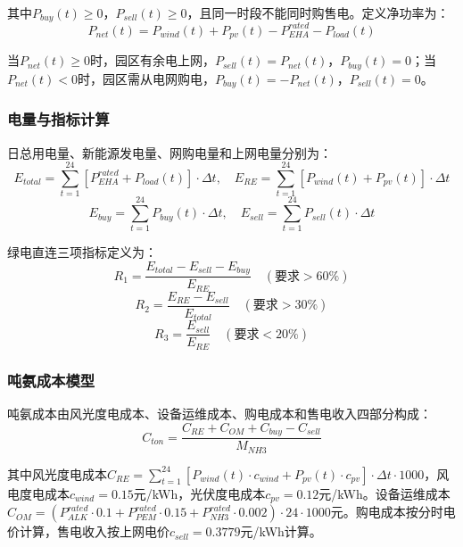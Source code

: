 其中$P_{buy}(t) \geq 0$，$P_{sell}(t) \geq 0$，且同一时段不能同时购售电。定义净功率为：
\begin{equation}
P_{net}(t) = P_{wind}(t) + P_{pv}(t) - P_{EHA}^{rated} - P_{load}(t)
\end{equation}

当$P_{net}(t) \geq 0$时，园区有余电上网，$P_{sell}(t) = P_{net}(t)$，$P_{buy}(t) = 0$；当$P_{net}(t) < 0$时，园区需从电网购电，$P_{buy}(t) = -P_{net}(t)$，$P_{sell}(t) = 0$。

\subsubsection{电量与指标计算}

日总用电量、新能源发电量、网购电量和上网电量分别为：
\begin{equation}
E_{total} = \sum_{t=1}^{24} [P_{EHA}^{rated} + P_{load}(t)] \cdot \Delta t, \quad E_{RE} = \sum_{t=1}^{24} [P_{wind}(t) + P_{pv}(t)] \cdot \Delta t
\end{equation}
\begin{equation}
E_{buy} = \sum_{t=1}^{24} P_{buy}(t) \cdot \Delta t, \quad E_{sell} = \sum_{t=1}^{24} P_{sell}(t) \cdot \Delta t
\end{equation}

绿电直连三项指标定义为：
\begin{equation}\label{eq:R1}
R_1 = \frac{E_{total} - E_{sell} - E_{buy}}{E_{RE}} \quad (\text{要求} > 60\%)
\end{equation}
\begin{equation}\label{eq:R2}
R_2 = \frac{E_{RE} - E_{sell}}{E_{total}} \quad (\text{要求} > 30\%)
\end{equation}
\begin{equation}\label{eq:R3}
R_3 = \frac{E_{sell}}{E_{RE}} \quad (\text{要求} < 20\%)
\end{equation}

\subsubsection{吨氨成本模型}

吨氨成本由风光度电成本、设备运维成本、购电成本和售电收入四部分构成：
\begin{equation}\label{eq:cost}
C_{ton} = \frac{C_{RE} + C_{OM} + C_{buy} - C_{sell}}{M_{NH3}}
\end{equation}

其中风光度电成本$C_{RE} = \sum_{t=1}^{24} [P_{wind}(t) \cdot c_{wind} + P_{pv}(t) \cdot c_{pv}] \cdot \Delta t \cdot 1000$，风电度电成本$c_{wind} = 0.15$元/kWh，光伏度电成本$c_{pv} = 0.12$元/kWh。设备运维成本$C_{OM} = (P_{ALK}^{rated} \cdot 0.1 + P_{PEM}^{rated} \cdot 0.15 + P_{NH3}^{rated} \cdot 0.002) \cdot 24 \cdot 1000$元。购电成本按分时电价计算，售电收入按上网电价$c_{sell} = 0.3779$元/kWh计算。

